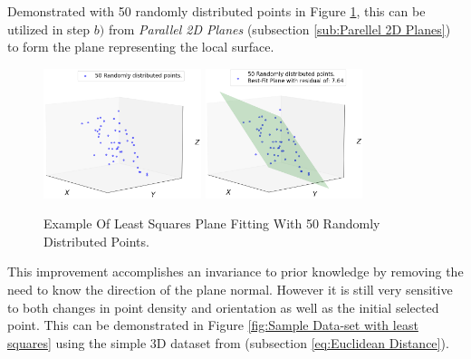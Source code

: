 \documentclass[%
]{USN-MSc}
\begin{document}
Demonstrated with 50 randomly distributed points in Figure \ref{fig:least squares}, this can be utilized in step \(b)\) from \textit{Parallel 2D Planes} (subsection \ref{sub:Parellel 2D Planes}) to form the plane representing the local surface.

\begin{figure}[H]
  \centering
  \includegraphics[width=0.41\textwidth]{fig/Plane 6.50.png}
  \includegraphics[width=0.41\textwidth]{fig/Plane 6.77.png}
  \caption{Example Of Least Squares Plane Fitting With 50 Randomly Distributed Points.}
  \label{fig:least squares}
\end{figure}

This improvement accomplishes an invariance to prior knowledge by removing the need to know the direction of the plane normal. However it is still very sensitive to both changes in point density and orientation as well as the initial selected point. This can be demonstrated in Figure \ref{fig:Sample Data-set with least squares} using the simple 3D dataset from (subsection \ref{eq:Euclidean Distance}).
\end{document}
